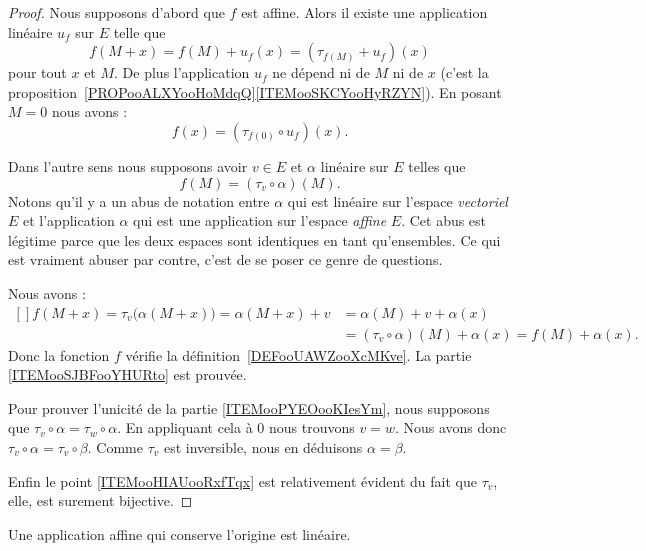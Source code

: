\begin{proof}
	Nous supposons d'abord que \( f\) est affine. Alors il existe une application linéaire \( u_f\) sur \( E\) telle que
	\begin{equation}
		f(M+x)=f(M)+u_f(x)=(\tau_{f(M)}+u_f)(x)
	\end{equation}
	pour tout \( x\) et \( M\). De plus l'application \( u_f\) ne dépend ni de \( M\) ni de \( x\) (c'est la proposition~\ref{PROPooALXYooHoMdqQ}\ref{ITEMooSKCYooHyRZYN}). En posant \( M=0\) nous avons :
	\begin{equation}
		f(x)=(\tau_{f(0)}\circ u_f)(x).
	\end{equation}

	Dans l'autre sens nous supposons avoir \( v\in E\) et \( \alpha\) linéaire sur \( E\) telles que
	\begin{equation}
		f(M)=(\tau_v\circ\alpha)(M).
	\end{equation}
	Notons qu'il y a un abus de notation entre \( \alpha\) qui est linéaire sur l'espace \emph{vectoriel} \( E\) et l'application \( \alpha\) qui est une application sur l'espace \emph{affine} \( E\). Cet abus est légitime parce que les deux espaces sont identiques en tant qu'ensembles. Ce qui est vraiment abuser par contre, c'est de se poser ce genre de questions.

	Nous avons :
	\begin{equation}
		\begin{aligned}[]
			f(M+x)=\tau_v\big( \alpha(M+x) \big)=\alpha(M+x)+v & =\alpha(M)+v+\alpha(x)
			\\&=(\tau_v\circ\alpha)(M)+\alpha(x)=f(M)+\alpha(x).
		\end{aligned}
	\end{equation}
	Donc la fonction \( f\) vérifie la définition~\ref{DEFooUAWZooXcMKve}. La partie \ref{ITEMooSJBFooYHURto} est prouvée.

	Pour prouver l'unicité de la partie \ref{ITEMooPYEOooKIesYm}, nous supposons que \( \tau_v\circ\alpha=\tau_w\circ \alpha\). En appliquant cela à \( 0\) nous trouvons \( v=w\). Nous avons donc \( \tau_v\circ \alpha=\tau_v\circ\beta\). Comme \( \tau_v\) est inversible, nous en déduisons \( \alpha=\beta\).

	Enfin le point \ref{ITEMooHIAUooRxfTqx} est relativement évident du fait que \( \tau_v\), elle, est surement bijective.
\end{proof}

\begin{corollary}       \label{CORooATCNooUwEPNI}
	Une application affine qui conserve l'origine est linéaire.
\end{corollary}

